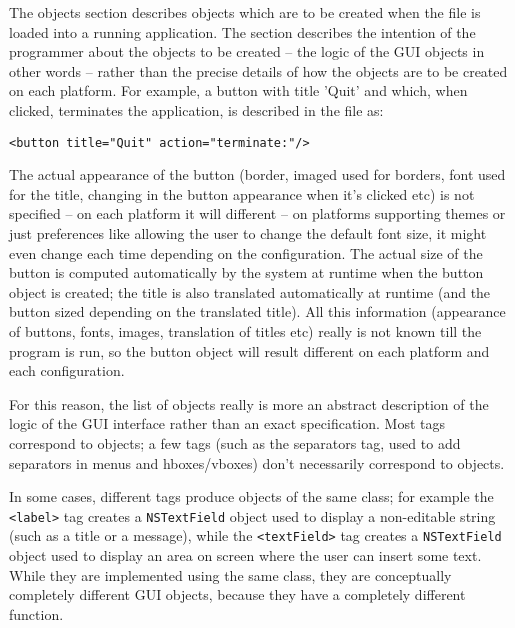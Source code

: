 The objects section describes objects which are to be created when the
file is loaded into a running application.  The section describes the
intention of the programmer about the objects to be created -- the
logic of the GUI objects in other words -- rather than the precise
details of how the objects are to be created on each platform.  For
example, a button with title 'Quit' and which, when clicked,
terminates the application, is described in the file as:
\begin{verbatim}
<button title="Quit" action="terminate:"/>
\end{verbatim}
The actual appearance of the button (border, imaged used for borders,
font used for the title, changing in the button appearance when it's
clicked etc) is not specified -- on each platform it will different --
on platforms supporting themes or just preferences like allowing the
user to change the default font size, it might even change each time
depending on the configuration.  The actual size of the button is
computed automatically by the system at runtime when the button object
is created; the title is also translated automatically at runtime (and
the button sized depending on the translated title).  All this
information (appearance of buttons, fonts, images, translation of
titles etc) really is not known till the program is run, so the button
object will result different on each platform and each configuration.

For this reason, the list of objects really is more an abstract
description of the logic of the GUI interface rather than an exact
specification.  Most tags correspond to objects; a few tags (such as
the separators tag, used to add separators in menus and hboxes/vboxes)
don't necessarily correspond to objects.

In some cases, different tags produce objects of the same class; for
example the \texttt{<label>} tag creates a \texttt{NSTextField} object
used to display a non-editable string (such as a title or a message),
while the \texttt{<textField>} tag creates a \texttt{NSTextField}
object used to display an area on screen where the user can insert
some text.  While they are implemented using the same class, they are
conceptually completely different GUI objects, because they have a
completely different function.


